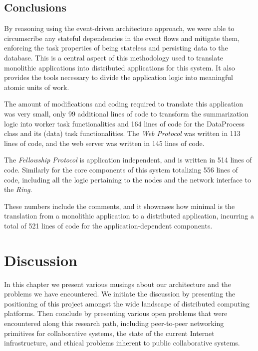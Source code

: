 \documentclass[12pt, titlepage]{uo_temp}
\begin{document}
     
     \section{Conclusions}
     By reasoning using the event-driven architecture approach, we were able to
     circumscribe any stateful dependencies in the event flows and mitigate them,
     enforcing the task properties of being stateless and persisting data to the
     database. This is a central aspect of this methodology used to translate monolithic
     applications into distributed applications for this system. It also provides the
     tools necessary to divide the application logic into meaningful atomic units of
     work. 

     The amount of modifications and coding required to translate this application was
     very small, only 99 additional lines of code to transform the summarization logic
     into worker task functionalities and 164 lines of code for the DataProcess class and
     its (data) task functionalities. The \emph{Web Protocol} was written in 113 lines of
     code, and the web server was written in 145 lines of code.
     
     The \emph{Fellowship Protocol} is application independent, and is written in 514
     lines of code. Similarly for the core components of this system totalizing 556 lines
     of code, including all the logic pertaining to the nodes and the network interface to
     the \emph{Ring}.
     
     These numbers include the comments, and it showcases how minimal is the translation
     from a monolithic application to a distributed application, incurring a total of 521
     lines of code for the application-dependent components.

     \chapter{Discussion}
     In this chapter we present various musings about our architecture and the problems we
     have encountered. We initiate the discussion by presenting the positioning of this
     project amongst the wide landscape of distributed computing platforms. Then conclude
     by presenting various open problems that were encountered along this research path,
     including peer-to-peer networking primitives for collaborative systems, the state of
     the current Internet infrastructure, and ethical problems inherent to public
     collaborative systems.
\end{document}
